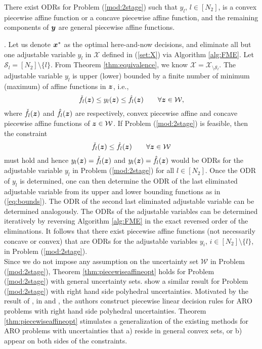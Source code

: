 \documentclass[fleqn,isre,blindrev]{informs4}
\newcommand{\mb}[1]{\mbox{\boldmath \ensuremath{#1}}}
\begin{document}
\begin{theorem} \label{thm:piecewiseaffineopt}
There exist ODRs for Problem (\ref{mod:2stage}) such that $y_l$, $l\in [N_2]$, is a convex piecewise affine function or a concave piecewise affine function, and the remaining components of $\mb{y}$ are general piecewise affine functions.
\end{theorem}
. Let us denote $\mb{x}^*$ as the optimal here-and-now decisions, and eliminate all but one adjustable variable $y_{l}$ in $\mathcal{X}$ defined in (\ref{set:X}) via Algorithm \ref{alg:FME}.  Let $\mathcal{S}_l=[N_2]\setminus \{l\}$. From Theorem \ref{thm:equivalence}, we know $\mathcal{X}=\mathcal{X}_{\setminus\mathcal{S}_l}$. The adjustable variable  $y_{l}$ is upper (lower) bounded by a finite number of minimum (maximum) of affine functions in $\mb{z}$, i.e.,
\begin{equation}
\label{eq:bounds}
\check{f}_l(\mb{z}) \leq y_{l}(\mb{z}) \leq \hat{f}_l(\mb{z}) \qquad \forall \mb{z} \in \mathcal{W},
\end{equation}
where $\check{f}_l(\mb{z})$ and $\hat{f}_l(\mb{z})$ are respectively, convex piecewise affine and concave piecewise affine functions of $\mb{z} \in \mathcal{W}$. If Problem (\ref{mod:2stage}) is feasible, then the constraint
\begin{equation*}
\check{f}_l(\mb{z}) \leq \hat{f}_l(\mb{z}) \qquad \forall \mb{z} \in \mathcal{W}
\end{equation*}
must hold and hence $y_{l}(\mb{z}) = \check{f}_l(\mb{z})$ and $y_{l}(\mb{z}) = \hat{f}_l(\mb{z})$ would be ODRs for the adjustable variable $y_l$ in Problem (\ref{mod:2stage}) for all $l \in [N_2]$. Once the ODR of $y_l$ is determined, one can then determine the ODR of the last eliminated adjustable variable from its upper and lower bounding functions as in (\ref{eq:bounds}).  {The ODR of the second last eliminated adjustable variable can be determined analogously. The ODRs of the adjustable variables can be determined iteratively by reversing Algorithm \ref{alg:FME} in the exact reversed order of the eliminations.} It follows that there exist piecewise affine functions (not necessarily concave or convex) that are ODRs for the adjustable variables $y_i$, $i\in [N_2]\setminus \{l\}$, in Problem (\ref{mod:2stage}). \hfill \Halmos  \\

Since we do not impose any assumption on the uncertainty set $\mathcal{W}$ in Problem (\ref{mod:2stage}), Theorem \ref{thm:piecewiseaffineopt} holds for Problem (\ref{mod:2stage}) with general uncertainty sets.  {\cite{bbm03} show a similar result for Problem (\ref{mod:2stage}) with right hand side polyhedral uncertainties. Motivated by the result of \cite{bbm03}, in \cite{bg15} and \cite{beg16}, the authors construct piecewise linear decision rules for ARO problems with right hand side polyhedral uncertainties. Theorem \ref{thm:piecewiseaffineopt} stimulates a generalization of the existing methods for ARO problems with uncertainties that a) reside in general convex sets, or b) appear on both sides of the constraints. }
\end{document}

